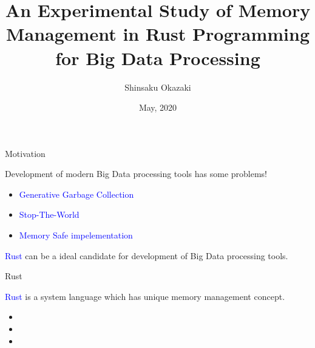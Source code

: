 \documentclass[9pt]{beamer}
\title[]{An Experimental Study of Memory Management in Rust Programming for Big Data Processing}
\date{May, 2020}
\author[]{Shinsaku Okazaki}
\institute{}
\begin{document}
\maketitle








\begin{frame}[fragile]{Motivation}

Development of modern Big Data processing tools has some problems!

\begin{itemize}

  \item \textcolor{blue}{Generative Garbage Collection}
  \item \textcolor{blue}{Stop-The-World}
  \item \textcolor{blue}{Memory Safe impelementation} 
\end{itemize}

\textcolor{blue}{Rust} can be a ideal candidate for development of Big Data processing tools.



\end{frame}



\begin{frame}[fragile]{Rust}

    \textcolor{blue}{Rust} is a system language which has unique memory management concept.
    
    \begin{itemize}
        \item {} 
        \item {}
        \item {}
    \end{itemize}
\end{frame}
\end{document}
